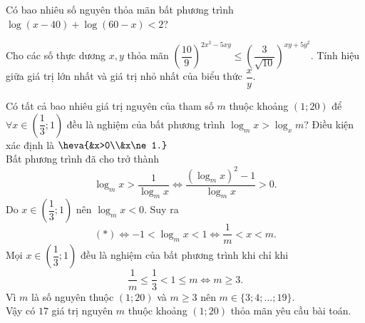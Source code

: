 \begin{bt}%
Có bao nhiêu số nguyên thỏa mãn bất phương trình $\log(x-40)+\log(60-x)<2$?
\end{bt}
\begin{bt}%
Cho các số thực dương $x, y$ thỏa mãn $\left(\dfrac{10}{9}\right)^{2x^2-5xy}\leq \left(\dfrac{3}{\sqrt{10}}\right)^{xy+5y^2}$. Tính hiệu giữa giá trị lớn nhất và giá trị nhỏ nhất của biểu thức $\dfrac{x}{y}$.
\end{bt}

\begin{bt}%
Có tất cả bao nhiêu giá trị nguyên của tham số $ m $ thuộc khoảng $ (1;20) $ để $ \forall x\in\left( \dfrac{1}{3};1 \right) $ đều là nghiệm của bất phương trình $ \log_mx>\log_xm $?
\loigiai
{
Điều kiện xác định là $\heva{&x>0\\&x\ne 1.}$\\
Bất phương trình đã cho trở thành
\[\log_mx>\dfrac{1}{\log_mx}\Leftrightarrow \dfrac{(\log_mx)^2-1}{\log_mx}>0. \tag{$*$}\]
Do $ x\in\left( \dfrac{1}{3};1 \right) $ nên $ \log_mx<0 $. Suy ra
$$ (*)\Leftrightarrow-1<\log_mx<1\Leftrightarrow \dfrac{1}{m}<x<m.$$
Mọi $ x\in\left( \dfrac{1}{3};1 \right) $ đều là nghiệm của bất phương trình khi chỉ khi
$$\dfrac{1}{m}\le\dfrac{1}{3}<1\le m\Leftrightarrow m\ge 3.$$
Vì $m$ là số nguyên thuộc $(1;20)$ và $m\geq 3$ nên $m\in \{3;4;\ldots;19\}$.\\
Vậy có $17$ giá trị nguyên $m$ thuộc khoảng $(1;20)$ thỏa mãn yêu cầu bài toán.
}
\end{bt}

